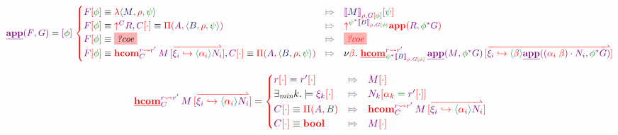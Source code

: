 \documentclass{article}
\newcommand\Eval[2]{
  \FmtFam{
    {\left\llbracket\FmtTm{#1}\right\rrbracket}_{\FmtVal{#2}}
  }
}
\begin{document}
\[
  \SemApp{F}{G}
  =
  \Fam{\phi}{
    \begin{cases}
      \Cond{
        \FamTest{F}{\phi}
        \equiv
        \VLam{
          \VClo{M}{\rho}{\psi}
        }
      }{
        \FamTest{
          \Eval{M}{\rho, \FamTest{G}{\phi}}
        }{
          \psi
        }
      }
      \\
      \Cond{
        \FamTest{F}{\phi}
        \equiv
        \VUp{C}{R},
        \FamTest{C}{\RstId}\equiv \VPi{A}{\VClo{B}{\rho}{\psi}}
      }{
        \VUp{
          \Rst{\psi}{\Eval{B}{\rho,\FamTest{G}{\phi}}}
        }{
          \VApp{R}{
            \Rst{\phi}{G}
          }
        }
      }
      \\
      \Cond{
        \FamTest{F}{\phi}
        \equiv
        \Hole{coe}
      }{
        \Hole{coe}
      }
      \\
      \Cond{
        \FamTest{F}{\phi}
        \equiv
        \VHCom{r}{r'}{C}{M}{
          \Vec{
            \VFace{\xi_i}{
              \VAbs{\alpha_i}{N_i}
            }
          }
        },
        \FamTest{C}{\RstId}\equiv
        \VPi{A}{\VClo{B}{\rho}{\psi}}
      }{
        \Fresh{\beta}{
          \SemHCom{r}{r'}{
            \Rst{\psi}{\Eval{B}{\rho,\FamTest{G}{\phi}}}
          }{
            \SemApp{M}{\Rst{\phi}{G}}
          }{
            \Vec{
              \VFace{\xi_i}{
                \VAbs{\beta}{
                  \SemApp{
                    \Act{
                      \Swap{\alpha_i}{\beta}
                    }{N_i}
                  }{
                    \Rst{\phi}{G}
                  }
                }
              }
            }
          }
        }
      }
    \end{cases}
  }
\]

\[
  \SemHCom{r}{r'}{C}{M}{
    \Vec{
      \VFace{\xi_i}{\VAbs{\alpha_i}{N_i}}
    }
  }
  =
  \FmtVal{
    \begin{cases}
      \Cond{
        \FamTest{r}{\RstId}=\FamTest{r'}{\RstId}
      }{
        \FamTest{M}{\RstId}
      }
      \\
      \Cond{
        \exists_{\textit{min}}k.\models\FamTest{\xi_k}{\RstId}
      }{
        \FamTest{N_k}{
          \RstEquate{\alpha_k}{\FamTest{r'}{\RstId}}
        }
      }
      \\
      \Cond{
        \FamTest{C}{\RstId}
        \equiv
        \VPi{A}{B}
      }{
        \VHCom{r}{r'}{C}{M}{
          \Vec{
            \VFace{\xi_i}{\VAbs{\alpha_i}{N_i}}
          }
        }
      }
      \\
      \Cond{
        \FamTest{C}{\RstId}\equiv\VBool
      }{
        \FamTest{M}{\RstId}
      }
    \end{cases}
  }
\]
\end{document}
